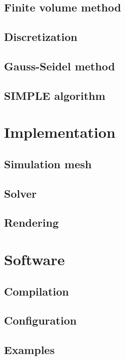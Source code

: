 \documentclass[12pt]{article}
\begin{document}
\subsection{Finite volume method}

\subsection{Discretization}

\subsection{Gauss-Seidel method}

\subsection{SIMPLE algorithm}

\section{Implementation}

\subsection{Simulation mesh}

\subsection{Solver}

\subsection{Rendering}

\section{Software}

\subsection{Compilation}

\subsection{Configuration}

\subsection{Examples}
\end{document}
